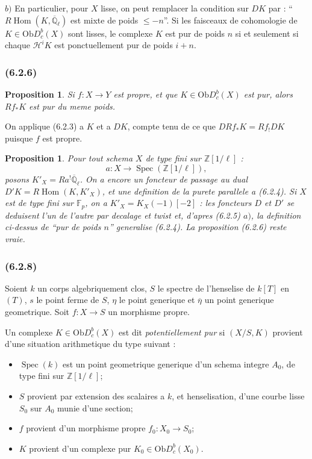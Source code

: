 \documentclass[12pt,a4paper]{article}
\theoremstyle{plain}
\newtheorem{proposition}[theorem]{Proposition}
\theoremstyle{definition}
\theoremstyle{remark}
\newcommand{\Ob}{\mathrm{Ob}}
\DeclareMathOperator{\Hom}{Hom}
\DeclareMathOperator{\Spec}{Spec}
\newcommand{\bbZ}{\mathbb{Z}}
\newcommand{\scrH}{\mathscr{H}}
\newcommand{\Qlb}{\overline{\mathbb{Q}}_\ell}
\newcommand{\Fp}{\mathbb{F}_p}
\begin{document}
$b)$ En particulier, pour $X$ lisse, on peut remplacer la condition sur $DK$ par : ``$R\Hom(K, \Qlb)$ est mixte de poids $\leq -n$''. Si les faisceaux de cohomologie de $K \in \Ob D_c^b(X)$ sont lisses, le complexe $K$ est pur de poids $n$ si et seulement si chaque $\scrH^i K$ est ponctuellement pur de poids $i + n$.

\subsubsection*{\textup{(6.2.6)}}

\begin{proposition}
Si $f : X \to Y$ est propre, et que $K \in \Ob D_c^b(X)$ est pur, alors $Rf_* K$ est pur du meme poids.
\end{proposition}

On applique (6.2.3) a $K$ et a $DK$, compte tenu de ce que $DRf_* K = Rf_! DK$ puisque $f$ est propre.

\begin{proposition}
Pour tout schema $X$ de type fini sur $\bbZ[1/\ell]$ :
\[
a : X \to \Spec(\bbZ[1/\ell]),
\]
posons $K'_X = Ra^! \Qlb$. On a encore un foncteur de passage au dual $D' K = R\Hom(K, K'_X)$, et une definition de la purete parallele a (6.2.4). Si $X$ est de type fini sur $\Fp$, on a $K'_X = K_X(-1)[-2]$ : les foncteurs $D$ et $D'$ se deduisent l'un de l'autre par decalage et twist et, d'apres (6.2.5) $a)$, la definition ci-dessus de ``pur de poids $n$'' generalise (6.2.4). La proposition (6.2.6) reste vraie.
\end{proposition}

\subsubsection*{\textup{(6.2.8)}}

Soient $k$ un corps algebriquement clos, $S$ le spectre de l'henselise de $k[T]$ en $(T)$, $s$ le point ferme de $S$, $\eta$ le point generique et $\overline{\eta}$ un point generique geometrique. Soit $f : X \to S$ un morphisme propre.

Un complexe $K \in \Ob D_c^b(X)$ est dit \emph{potentiellement pur} si $(X/S, K)$ provient d'une situation arithmetique du type suivant :
\begin{itemize}
\item[$a)$] $\Spec(k)$ est un point geometrique generique d'un schema integre $A_0$, de type fini sur $\bbZ[1/\ell]$;
\item[$b)$] $S$ provient par extension des scalaires a $k$, et henselisation, d'une courbe lisse $S_0$ sur $A_0$ munie d'une section;
\item[$c)$] $f$ provient d'un morphisme propre $f_0 : X_0 \to S_0$;
\item[$d)$] $K$ provient d'un complexe pur $K_0 \in \Ob D_c^b(X_0)$.
\end{itemize}
\end{document}
